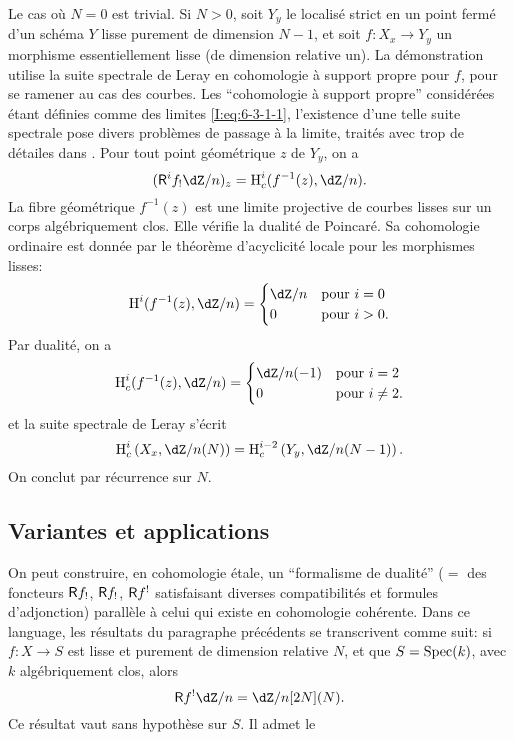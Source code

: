 Le cas où $N=0$ est trivial. Si $N>0$, soit $Y_y$ le localisé strict en un 
point fermé d'un schéma $Y$ lisse purement de dimension $N-1$, et soit 
$f:X_x\to Y_y$ un morphisme essentiellement lisse (de dimension relative un). 
La démonstration utilise la suite spectrale de Leray en cohomologie à 
support propre pour $f$, pour se ramener au cas des courbes. Les ``cohomologie 
à support propre'' considérées étant définies comme des limites 
\eqref{I:eq:6-3-1-1}, l'existence d'une telle suite spectrale pose divers 
problèmes de passage à la limite, traités avec trop de détailes dans 
\cite[XVIII]{sga4}. Pour tout point géométrique $z$ de $Y_y$, on a 
\[
  (\R^if_! \dZ/n)_z = \h_c^i(f^{-1}(z),\dZ/n) \text{.}
\]
La fibre géométrique $f^{-1}(z)$ est une limite projective de courbes lisses 
sur un corps algébriquement clos. Elle vérifie la dualité de Poincaré. 
Sa cohomologie ordinaire est donnée par le théorème d'acyclicité locale 
pour les morphismes lisses: 
\[
  \h^i(f^{-1}(z),\dZ/n) 
    = \begin{cases}
        \dZ/n & \text{pour $i=0$} \\
        0     & \text{pour $i>0$.}
      \end{cases}
\]
Par dualité, on a 
\[
  \h_c^i(f^{-1}(z),\dZ/n) 
    = \begin{cases}
        \dZ/n(-1) & \text{pour $i=2$} \\
        0         & \text{pour $i\ne 2$.}
      \end{cases}
\]
et la suite spectrale de Leray s'écrit 
\[
  \h_c^i\left(X_x,\dZ/n(N)\right) = \h_c^{i-2}\left(Y_y,\dZ/n(N-1)\right) \text{.}
\]
On conclut par récurrence sur $N$. 










\subsection{Variantes et applications}\label{I:6-4}

On peut construire, en cohomologie étale, un ``formalisme de dualité'' 
($=$ des foncteurs $\mathsf{R} f_!$, $\mathsf{R} f_!$, $\mathsf{R} f^!$ satisfaisant diverses 
compatibilités et formules d'adjonction) parallèle à celui qui existe en 
cohomologie cohérente. Dans ce language, les résultats du paragraphe 
précédents se transcrivent comme suit: si $f:X\to S$ est lisse et purement 
de dimension relative $N$, et que $S=\operatorname{Spec}(k)$, avec $k$ algébriquement clos, 
alors 
\[
  \R f^! \dZ/n = \dZ/n [2N](N) \text{.}
\]
Ce résultat vaut sans hypothèse sur $S$. Il admet le 





